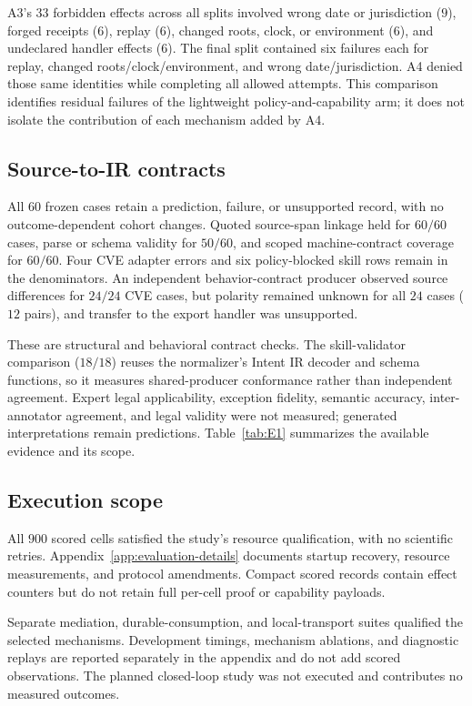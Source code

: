 A3's $33$ forbidden effects across all splits involved wrong date or jurisdiction ($9$), forged receipts ($6$), replay ($6$), changed roots, clock, or environment ($6$), and undeclared handler effects ($6$). The final split contained six failures each for replay, changed roots/clock/environment, and wrong date/jurisdiction. A4 denied those same identities while completing all allowed attempts. This comparison identifies residual failures of the lightweight policy-and-capability arm; it does not isolate the contribution of each mechanism added by A4.

\subsection{Source-to-IR contracts}
\label{sec:eval-source}

All $60$ frozen cases retain a prediction, failure, or unsupported record, with no outcome-dependent cohort changes. Quoted source-span linkage held for $60/60$ cases, parse or schema validity for $50/60$, and scoped machine-contract coverage for $60/60$. Four CVE adapter errors and six policy-blocked skill rows remain in the denominators. An independent behavior-contract producer observed source differences for $24/24$ CVE cases, but polarity remained unknown for all $24$ cases ($12$ pairs), and transfer to the export handler was unsupported.

These are structural and behavioral contract checks. The skill-validator comparison ($18/18$) reuses the normalizer's Intent IR decoder and schema functions, so it measures shared-producer conformance rather than independent agreement. Expert legal applicability, exception fidelity, semantic accuracy, inter-annotator agreement, and legal validity were not measured; generated interpretations remain predictions. Table~\ref{tab:E1} summarizes the available evidence and its scope.

\subsection{Execution scope}
\label{sec:eval-negative}

All $900$ scored cells satisfied the study's resource qualification, with no scientific retries. Appendix~\ref{app:evaluation-details} documents startup recovery, resource measurements, and protocol amendments. Compact scored records contain effect counters but do not retain full per-cell proof or capability payloads.

Separate mediation, durable-consumption, and local-transport suites qualified the selected mechanisms. Development timings, mechanism ablations, and diagnostic replays are reported separately in the appendix and do not add scored observations. The planned closed-loop study was not executed and contributes no measured outcomes.
